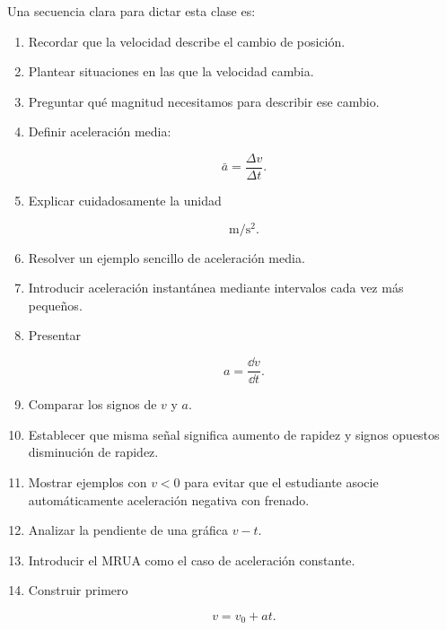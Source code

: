 \begin{notapedagogica}
Una secuencia clara para dictar esta clase es:

\begin{enumerate}

    \item Recordar que la velocidad describe el cambio de posición.

    \item Plantear situaciones en las que la velocidad cambia.

    \item Preguntar qué magnitud necesitamos para describir ese cambio.

    \item Definir aceleración media:

    \[
    \bar{a}=\frac{\Delta v}{\Delta t}.
    \]

    \item Explicar cuidadosamente la unidad

    \[
    \si{\meter\per\second\squared}.
    \]

    \item Resolver un ejemplo sencillo de aceleración media.

    \item Introducir aceleración instantánea mediante intervalos cada vez más
    pequeños.

    \item Presentar

    \[
    a=\frac{\dd v}{\dd t}.
    \]

    \item Comparar los signos de \(v\) y \(a\).

    \item Establecer que misma señal significa aumento de rapidez y signos
    opuestos disminución de rapidez.

    \item Mostrar ejemplos con \(v<0\) para evitar que el estudiante asocie
    automáticamente aceleración negativa con frenado.

    \item Analizar la pendiente de una gráfica \(v-t\).

    \item Introducir el MRUA como el caso de aceleración constante.

    \item Construir primero

    \[
    v=v_0+at.
    \]


\end{enumerate}
\end{notapedagogica}
